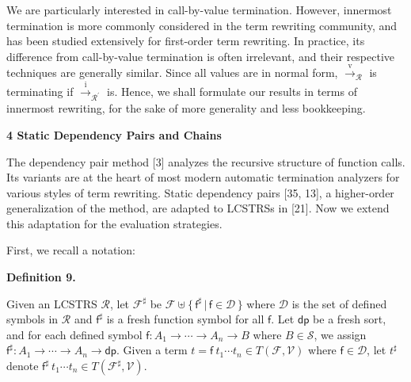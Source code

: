 \documentclass[10pt,a4paper]{amsart}
\begin{document}
 
 
 
We are particularly interested in call-by-value termination. However, innermost termination is more commonly considered in the term rewriting community, and has been studied extensively for first-order term rewriting. In practice, its difference from call-by-value termination is often irrelevant, and their respective techniques are generally similar. Since all values are in normal form, $\xrightarrow{\scriptscriptstyle\mathrm{v}}_{\mathcal{R}}$ is terminating if $\xrightarrow{\scriptscriptstyle\mathrm{i}}_{\mathcal{R}^{\prime}}$ is. Hence, we shall formulate our results in terms of innermost rewriting, for the sake of more generality and less bookkeeping.\par
 
 


 
\par\medskip\noindent\textbf{4 Static Dependency Pairs and Chains}\par
 
 
The dependency pair method [3] analyzes the recursive structure of function calls. Its variants are at the heart of most modern automatic termination analyzers for various styles of term rewriting. Static dependency pairs [35, 13], a higher-order generalization of the method, are adapted to LCSTRSs in [21]. Now we extend this adaptation for the evaluation strategies.\par
 
 
 
First, we recall a notation:\par
 
 
 
\par\medskip\noindent\textbf{Definition 9.}\par
 
 
Given an LCSTRS $\mathcal{R}$, let $\mathcal{F}^{\sharp}$ be $\mathcal{F}\uplus\{\,\mathsf{f}^{\sharp}\,|\,\mathsf{f}\in\mathcal{D}\,\}$ where $\mathcal{D}$ is the set of defined symbols in $\mathcal{R}$ and $\mathsf{f}^{\sharp}$ is a fresh function symbol for all $\mathsf{f}$. Let $\mathsf{dp}$ be a fresh sort, and for each defined symbol $\mathsf{f}:{A}_{1}\rightarrow\cdots\rightarrow{A}_{n}\rightarrow B$ where $B\in\mathcal{S}$, we assign $\mathsf{f}^{\sharp}:{A}_{1}\rightarrow\cdots\rightarrow{A}_{n}\rightarrow\mathsf{dp}$. Given a term $t={\mathsf{f}}\ {{t}_{1}\cdots{t}_{n}}\in T(\mathcal{F},\mathcal{V})$ where $\mathsf{f}\in\mathcal{D}$, let $t^{\sharp}$ denote ${\mathsf{f}^{\sharp}}\ {{t}_{1}\cdots{t}_{n}}\in T(\mathcal{F}^{\sharp},\mathcal{V})$.\par
 
\end{document}
